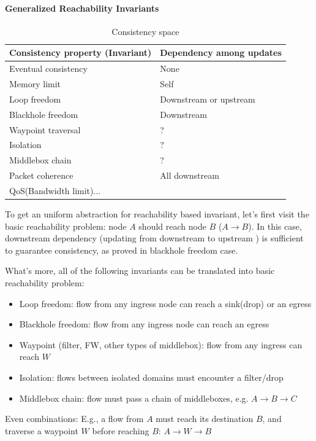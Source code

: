 \paragraph{Generalized Reachability Invariants}

\begin{table}[!th]
\centering
\footnotesize
\caption{Consistency space}
\label{tab:space}
\begin{tabular}{|p{3.5cm}|p{3.8cm}|}
\hline
Consistency property (Invariant) & Dependency among updates\\
\hline \hline
Eventual consistency & None \\ \hline
Memory limit & Self \\ \hline
Loop freedom & Downstream or upstream\\ \hline
Blackhole freedom & Downstream \\ \hline
Waypoint traversal & ? \\ \hline
Isolation & ? \\ \hline
Middlebox chain & ? \\ \hline
Packet coherence & All downstream \\ \hline
QoS(Bandwidth limit)... &  \\ \hline
\end{tabular}
\end{table}

To get an uniform abstraction for reachability based invariant, let's first visit
the basic reachability problem: node $A$ should reach node $B$ ($A \rightarrow B$).
In this case, downstream dependency (updating from downstream to upstream
) is sufficient to guarantee consistency, as proved in blackhole freedom case.  

What's more, all of the following invariants can be translated into basic reachability problem:
\begin{itemize}[noitemsep,topsep=0pt,leftmargin=*] 
\item Loop freedom: flow from any ingress node
can reach a sink(drop) or an egress 
\item Blackhole freedom: flow from any
ingress node can reach an egress 
\item Waypoint (filter, FW, other types of
middlebox): flow from any ingress can reach $W$ 
\item Isolation: flows between
isolated domains must encounter a filter/drop 
\item Middlebox chain: flow must
pass a chain of middleboxes, e.g. $A\rightarrow B\rightarrow C$ 
\end{itemize}
Even combinations: E.g., a flow from $A$ must reach its destination
$B$, and traverse a waypoint $W$ before reaching $B$: $A\rightarrow W\rightarrow
B$

